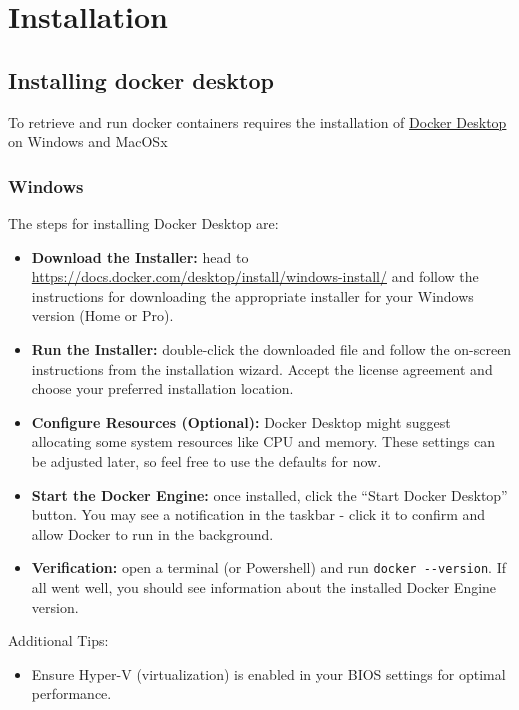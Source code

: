 \documentclass[
  8pt,
  a4paper]{article}
\providecommand{\tightlist}{%
  \setlength{\itemsep}{0pt}\setlength{\parskip}{0pt}}\usepackage{longtable,booktabs,array}
\begin{document}
\section{Installation}\label{installation}

\subsection{Installing docker desktop}\label{installing-docker-desktop}

To retrieve and run docker containers requires the installation of
\href{https://www.docker.com/products/docker-desktop/}{Docker Desktop}
on Windows and MacOSx

\subsubsection{Windows}\label{windows}

The steps for installing Docker Desktop are:

\begin{itemize}
\item
  \textbf{Download the Installer:} head to
  \url{https://docs.docker.com/desktop/install/windows-install/} and
  follow the instructions for downloading the appropriate installer for
  your Windows version (Home or Pro).
\item
  \textbf{Run the Installer:} double-click the downloaded file and
  follow the on-screen instructions from the installation wizard. Accept
  the license agreement and choose your preferred installation location.
\item
  \textbf{Configure Resources (Optional):} Docker Desktop might suggest
  allocating some system resources like CPU and memory. These settings
  can be adjusted later, so feel free to use the defaults for now.
\item
  \textbf{Start the Docker Engine:} once installed, click the ``Start
  Docker Desktop'' button. You may see a notification in the taskbar -
  click it to confirm and allow Docker to run in the background.
\item
  \textbf{Verification:} open a terminal (or Powershell) and run
  \texttt{docker\ -\/-version}. If all went well, you should see
  information about the installed Docker Engine version.
\end{itemize}

Additional Tips:

\begin{itemize}
\tightlist
\item
  Ensure Hyper-V (virtualization) is enabled in your BIOS settings for
  optimal performance.
\end{itemize}
\end{document}
